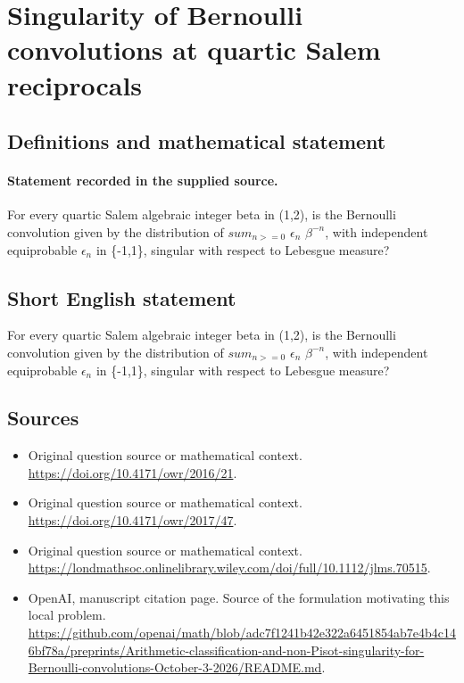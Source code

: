 \documentclass[11pt]{article}
\begin{document}
\section*{Singularity of Bernoulli convolutions at quartic Salem reciprocals}\label{statement}
\subsection{Definitions and mathematical statement}
\paragraph{Statement recorded in the supplied source.}
For every quartic Salem algebraic integer beta in (1,2), is the Bernoulli convolution given by the distribution of $sum_{n>=0}$ $\epsilon _n$ $\beta ^{-n}$, with independent equiprobable $\epsilon _n$ in \{-1,1\}, singular with respect to Lebesgue measure?
\subsection{Short English statement}
For every quartic Salem algebraic integer beta in (1,2), is the Bernoulli convolution given by the distribution of $sum_{n>=0}$ $\epsilon _n$ $\beta ^{-n}$, with independent equiprobable $\epsilon _n$ in \{-1,1\}, singular with respect to Lebesgue measure?
\subsection{Sources}
\begin{itemize}
\item[S1] Original question source or mathematical context.
\url{https://doi.org/10.4171/owr/2016/21}.
\item[S2] Original question source or mathematical context.
\url{https://doi.org/10.4171/owr/2017/47}.
\item[S3] Original question source or mathematical context.
\url{https://londmathsoc.onlinelibrary.wiley.com/doi/full/10.1112/jlms.70515}.
\item[S4] OpenAI, manuscript citation page. Source of the formulation motivating this local problem.
\url{https://github.com/openai/math/blob/adc7f1241b42e322a6451854ab7e4b4c146bf78a/preprints/Arithmetic-classification-and-non-Pisot-singularity-for-Bernoulli-convolutions-October-3-2026/README.md}.
\end{itemize}
\end{document}
